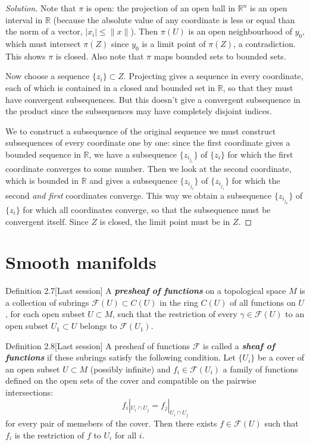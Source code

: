 \begin{proof}[Solution]
Note that \(\pi\) is open: the projection of an open ball in \(\mathbb{R}^n\) is an open interval in \(\mathbb{R}\) (because the absolute value of any coordinate is less or equal than the norm of a vector, \(|x_i|\leq \|x\|\)). Then \(\pi(U)\) is an open neighbourhood of \(y_0\), which must intersect \(\pi(Z)\) since \(y_0\) is a limit point of \(\pi(Z)\), a contradiction. This shows \(\pi\) is closed. Also note that \(\pi\) maps bounded sets to bounded sets.

Now choose a sequence $\{z_i\}\subset Z$. Projecting gives a sequence in every coordinate, each of which is contained in a closed and bounded set in \(\mathbb{R}\), so that they must have convergent subsequences. {\color{2}But this doesn't give a convergent subsequence in the product since the subsequences may have completely disjoint indices.}\fi

We to construct a subsequence of the original sequence we must construct subsequences of every coordinate one by one: since the first coordinate gives a bounded sequence in \(\mathbb{R}\), we have a subsequence \(\{z_{i_{j_1}}\}\) of \(\{z_i\}\) for which the first coordinate converges to some number. Then we look at the second coordinate, which is bounded in \(\mathbb{R}\) and gives a subsequence \(\{z_{i_{j_2}}\}\) of \(\{z_{i_{j_1}}\}\) for which the second \textit{and first} coordinates converge. This way we obtain a subsequence \(\{z_{i_{j_n}}\}\) of \(\{z_i\}\) for which all coordinates converge, so that the subsequence must be convergent itself. Since \(Z\) is closed, the limit point must be in \(Z\).
\end{proof}

\section{Smooth manifolds}
\begin{thing3}{Definition 2.7}[Last session]\leavevmode
	A \textit{\textbf{presheaf of functions}} on a topological space $M$ is a collection of subrings $\mathcal{F}(U) \subset C(U)$ in the ring $C(U)$ of all functions on $U$, for each open subset $U \subset M$, such that the restriction of every $\gamma \in \mathcal{F}(U)$ to an open subset $U_1 \subset U$ belongs to $\mathcal{F}(U_1)$.
\end{thing3}

\begin{thing3}{Definition 2.8}[Last session]\leavevmode
	A presheaf of functions $\mathcal{F}$ is called a \textit{\textbf{sheaf of functions}} if these subrings satisfy the following condition. Let $\{U_i\}$ be a cover of an open subset $U\subset M$ (possibly infinite) and $f_i \in \mathcal{F}(U_i)$ a family of functions defined on the open sets of the cover and compatible on the pairwise intersections:
	\[f_i|_{U_i\cap U_j}=f_j|_{U_i \cap U_j}\]
	for every pair of memebers of the cover. Then there exists $f \in \mathcal{F}(U)$ such that $f_i$ is the restriction of $f$ to $U_i$ for all $i$.
\end{thing3}


